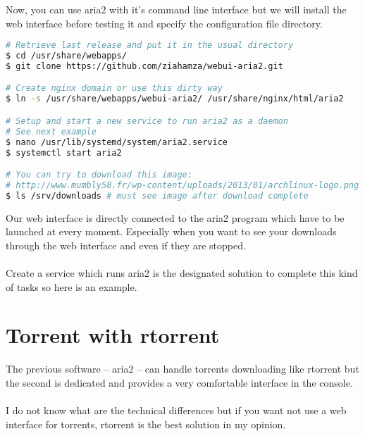 \lstset{language=bash,caption=Aria2 configuration file}


Now, you can use aria2 with it's command line interface but we will install the 
web interface before testing it and specify the configuration file directory.

\begin{lstlisting}[language=bash,caption=Install aria2 interface]
# Retrieve last release and put it in the usual directory
$ cd /usr/share/webapps/
$ git clone https://github.com/ziahamza/webui-aria2.git

# Create nginx domain or use this dirty way
$ ln -s /usr/share/webapps/webui-aria2/ /usr/share/nginx/html/aria2

# Setup and start a new service to run aria2 as a daemon
# See next example 
$ nano /usr/lib/systemd/system/aria2.service
$ systemctl start aria2

# You can try to download this image: 
# http://www.mumbly58.fr/wp-content/uploads/2013/01/archlinux-logo.png
$ ls /srv/downloads # must see image after download complete
\end{lstlisting}

Our web interface is directly connected to the aria2 program which have to be 
launched at every moment. Especially when you want to see your downloads through 
the web interface and even if they are stopped.
\\\\
Create a service which runs aria2 is the designated solution to complete this 
kind of tasks so here is an example.

\lstset{language=bash,caption=Run aria2 as a service}


\section{Torrent with rtorrent}

The previous software -- aria2 -- can handle torrents downloading like rtorrent 
but the second is dedicated and provides a very comfortable interface in the 
console. 
\\\\
I do not know what are the technical differences but if you want not 
use a web interface for torrents, rtorrent is the best solution in my opinion.

